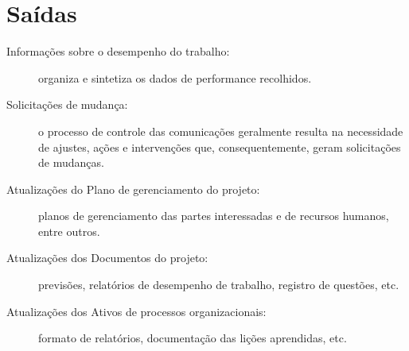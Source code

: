 \section{Saídas}

\begin{description}
	
	\item[Informações sobre o desempenho do trabalho:] organiza e sintetiza os dados de performance recolhidos.
	
	\item[Solicitações de mudança:] o processo de controle das comunicações geralmente resulta na necessidade de ajustes, ações e intervenções que, consequentemente, geram solicitações de mudanças.
	
	\item[Atualizações do Plano de gerenciamento do projeto:] planos de gerenciamento das partes interessadas e de recursos humanos, entre outros.
	
	\item[Atualizações dos Documentos do projeto:] previsões, relatórios de desempenho de trabalho, registro de questões, etc.
	
	\item[Atualizações dos Ativos de processos organizacionais:] formato de relatórios, documentação das lições aprendidas, etc.
	
\end{description}